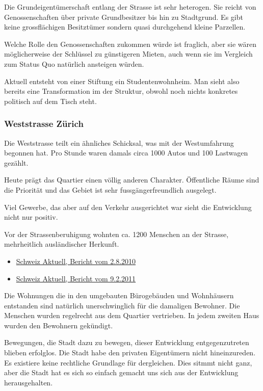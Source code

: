\documentclass[11pt]{article}
\begin{document}
Die Grundeigentümerschaft entlang der Strasse ist sehr heterogen. Sie reicht
von Genossenschaften über private Grundbesitzer bis hin zu Stadtgrund. Es
gibt keine grossflächigen Besitztümer sondern quasi durchgehend kleine
Parzellen.

Welche Rolle den Genossenschaften zukommen würde ist fraglich, aber sie wären
möglicherweise der Schlüssel zu günstigeren Mieten, auch wenn sie im
Vergleich zum Status Quo natürlich ansteigen würden.

Aktuell entsteht von einer Stiftung ein Studentenwohnheim. Man sieht also
bereits eine Transformation im der Struktur, obwohl noch nichts konkretes
politisch auf dem Tisch steht.

\subsubsection{Weststrasse Zürich}
\label{sec-2-1-2}

Die Weststrasse teilt ein ähnliches Schicksal, was mit der Westumfahrung
begonnen hat. Pro Stunde waren damals circa 1000 Autos und 100 Lastwagen
gezählt.

Heute prägt das Quartier einen völlig anderen Charakter. Öffentliche Räume
sind die Priorität und das Gebiet ist sehr fussgängerfreundlich ausgelegt.

Viel Gewerbe, das aber auf den Verkehr ausgerichtet war sieht die
Entwicklung nicht nur positiv.

Vor der Strassenberuhigung wohnten ca. 1200 Menschen an der Strasse,
mehrheitlich ausländischer Herkunft.

\begin{itemize}
\item \href{https://www.srf.ch/play/tv/tagesschau/video/weststrasse-endlich-wieder-ohne-verkehr?id\%3D77866ac6-343f-4af1-b856-b4dbf1a56092}{Schweiz Aktuell, Bericht vom 2.8.2010}
\item \href{https://www.srf.ch/play/tv/schweiz-aktuell/video/weststrasse?id\%3D7a960266-9558-460f-882f-db7c572aa28e}{Schweiz Aktuell, Bericht vom 9.2.2011}
\end{itemize}

Die Wohnungen die in den umgebauten Bürogebäuden und Wohnhäusern entstanden
sind natürlich unerschwinglich für die damaligen Bewohner. Die Menschen
wurden regelrecht aus dem Quartier vertrieben. In jedem zweiten Haus wurden
den Bewohnern gekündigt.

Bewegungen, die Stadt dazu zu bewegen, dieser Entwicklung entgegenzutreten
blieben erfolglos. Die Stadt habe den privaten Eigentümern nicht
hineinzureden. Es existiere keine rechtliche Grundlage für dergleichen. Dies
sitmmt nicht ganz, aber die Stadt hat es sich so einfach gemacht uns sich
aus der Entwicklung herausgehalten.
\end{document}
